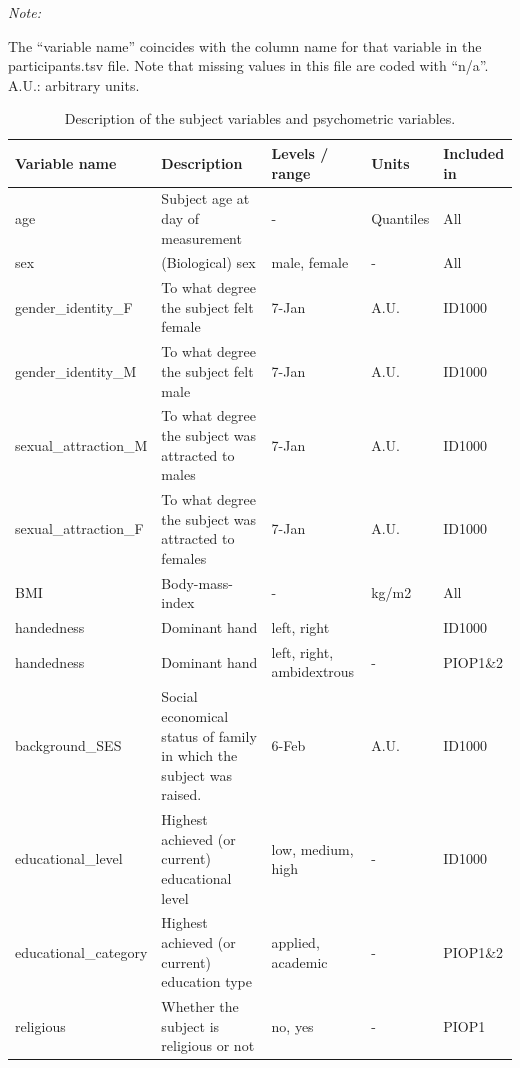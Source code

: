 \documentclass[11pt,american,]{memoir} %
\begin{document}
\begingroup\fontsize{8}{10}\selectfont

\begin{ThreePartTable}
\begin{TableNotes}[para]
\item \textit{Note: } 
\item The “variable name” coincides with the column name for that variable in the participants.tsv file. Note that missing values in this file are coded with “n/a”. A.U.: arbitrary units.
\end{TableNotes}
\begin{longtabu} to 
\caption{\label{tab:tab-aomic-S5}Description of the subject variables and psychometric variables.}\\
\toprule
Variable name & Description & Levels / range & Units & Included in\\
\midrule
age & Subject age at day of measurement & - & Quantiles & All\\
sex & (Biological) sex & male, female & - & All\\
gender\_identity\_F & To what degree the subject felt female & 7-Jan & A.U. & ID1000\\
gender\_identity\_M & To what degree the subject felt male & 7-Jan & A.U. & ID1000\\
sexual\_attraction\_M & To what degree the subject was attracted to males & 7-Jan & A.U. & ID1000\\
\addlinespace
sexual\_attraction\_F & To what degree the subject was attracted to females & 7-Jan & A.U. & ID1000\\
BMI & Body-mass-index & - & kg/m2 & All\\
handedness & Dominant hand & left, right &  & ID1000\\
handedness & Dominant hand & left, right, ambidextrous & - & PIOP1\&2\\
background\_SES & Social economical status of family in which the subject was raised. & 6-Feb & A.U. & ID1000\\
\addlinespace
educational\_level & Highest achieved (or current) educational level & low, medium, high & - & ID1000\\
educational\_category & Highest achieved (or current) education type & applied, academic & - & PIOP1\&2\\
religious & Whether the subject is religious or not & no, yes & - & PIOP1\\

\end{longtabu}
\end{ThreePartTable}
\end{document}
